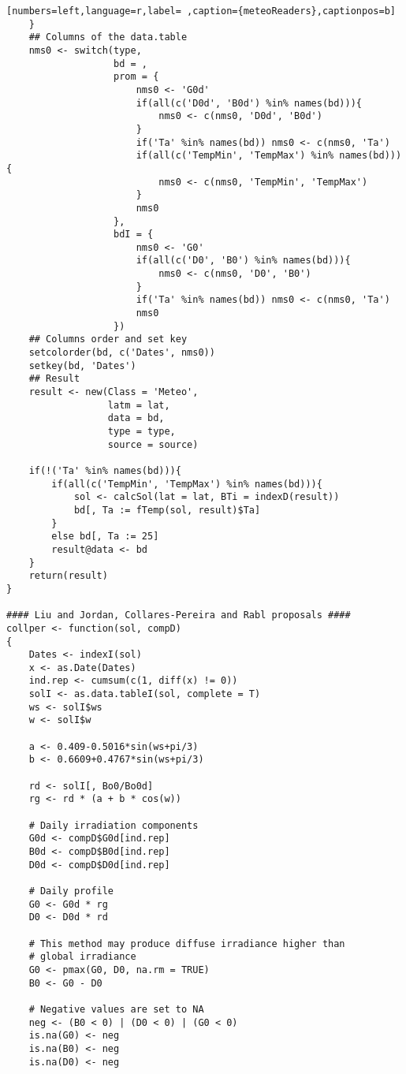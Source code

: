 \begin{lstlisting}[numbers=left,language=r,label= ,caption={meteoReaders},captionpos=b]
    }
    ## Columns of the data.table
    nms0 <- switch(type,
                   bd = ,
                   prom = {
                       nms0 <- 'G0d'
                       if(all(c('D0d', 'B0d') %in% names(bd))){
                           nms0 <- c(nms0, 'D0d', 'B0d')
                       }
                       if('Ta' %in% names(bd)) nms0 <- c(nms0, 'Ta')
                       if(all(c('TempMin', 'TempMax') %in% names(bd))){
                           nms0 <- c(nms0, 'TempMin', 'TempMax')
                       }
                       nms0
                   },
                   bdI = {
                       nms0 <- 'G0'
                       if(all(c('D0', 'B0') %in% names(bd))){
                           nms0 <- c(nms0, 'D0', 'B0')
                       }
                       if('Ta' %in% names(bd)) nms0 <- c(nms0, 'Ta')
                       nms0
                   })
    ## Columns order and set key
    setcolorder(bd, c('Dates', nms0))
    setkey(bd, 'Dates')
    ## Result
    result <- new(Class = 'Meteo',
                  latm = lat,
                  data = bd,
                  type = type,
                  source = source)

    if(!('Ta' %in% names(bd))){
        if(all(c('TempMin', 'TempMax') %in% names(bd))){
            sol <- calcSol(lat = lat, BTi = indexD(result))
            bd[, Ta := fTemp(sol, result)$Ta]
        }
        else bd[, Ta := 25]
        result@data <- bd
    }
    return(result)
}

#### Liu and Jordan, Collares-Pereira and Rabl proposals ####
collper <- function(sol, compD)
{
    Dates <- indexI(sol)
    x <- as.Date(Dates)
    ind.rep <- cumsum(c(1, diff(x) != 0))
    solI <- as.data.tableI(sol, complete = T)
    ws <- solI$ws
    w <- solI$w

    a <- 0.409-0.5016*sin(ws+pi/3)
    b <- 0.6609+0.4767*sin(ws+pi/3)

    rd <- solI[, Bo0/Bo0d]
    rg <- rd * (a + b * cos(w))

    # Daily irradiation components
    G0d <- compD$G0d[ind.rep]
    B0d <- compD$B0d[ind.rep]
    D0d <- compD$D0d[ind.rep]

    # Daily profile
    G0 <- G0d * rg
    D0 <- D0d * rd

    # This method may produce diffuse irradiance higher than
    # global irradiance
    G0 <- pmax(G0, D0, na.rm = TRUE)
    B0 <- G0 - D0

    # Negative values are set to NA
    neg <- (B0 < 0) | (D0 < 0) | (G0 < 0)
    is.na(G0) <- neg
    is.na(B0) <- neg
    is.na(D0) <- neg


\end{lstlisting}
